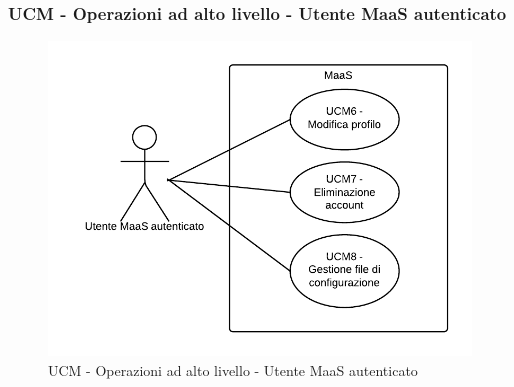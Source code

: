\subsubsection{UCM - Operazioni ad alto livello - Utente MaaS autenticato} 
    \begin{figure}[H]
      \begin{center}
      \includegraphics[scale=0.16]{UML/UCM - Operazioni ad alto livello - Utente MaaS autenticato.png}
      \caption{UCM - Operazioni ad alto livello - Utente MaaS autenticato}
      \end{center} 
    \end{figure}  
    
